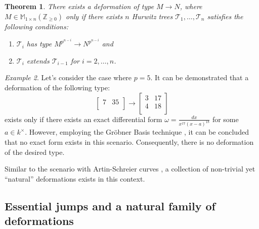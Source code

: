 \documentclass{compositio}
\newtheorem{theorem}{Theorem}[section]
\theoremstyle{remark}
\newtheorem{example}[theorem]{Example}
\theoremstyle{remark}
\begin{document}
\begin{theorem}
    There exists a deformation of type $M \xrightarrow{} N$, where $M \in \mathbb{M}_{1 \times n}(\mathbb{Z}_{\ge 0})$ only if there exists $n$ Hurwitz trees $\mathcal{T}_1, \ldots, \mathcal{T}_n$ satisfies the following conditions:
    \begin{enumerate}
        \item $\mathcal{T}_i$ has type $M^{p^{n-i}} \xrightarrow{} N^{p^{n-i}}$ and
        \item $\mathcal{T}_i$ extends $\mathcal{T}_{i-1}$ for $i=2, \ldots, n$.
    \end{enumerate}
\end{theorem}

\begin{example}
    Let's consider the case where $p=5$. It can be demonstrated that a deformation of the following type:
    \[\begin{bmatrix}
    7 & 35 \\
    \end{bmatrix} \xrightarrow{}  \begin{bmatrix}
   3 & 17 \\
   4 & 18 \\
   \end{bmatrix} \] 
   exists only if there exists an exact differential form $\omega = \frac{dx}{x^{17}(x-a)^{18}}$ for some $a \in k^{\times}$. However, employing the Gröbner Basis technique \cite[\S 6.1]{2020arXiv200203719D}, it can be concluded that no exact form exists in this scenario. Consequently, there is no deformation of the desired type.
\end{example}


Similar to the scenario with Artin-Schreier curves \cite[\S 4.1]{MR2985514}, a collection of non-trivial yet ``natural'' deformations exists in this context.









\subsection{Essential jumps and a natural family of deformations}
\label{secessentialdeform}
\end{document}
